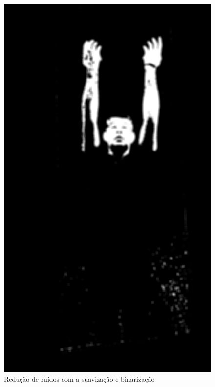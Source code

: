 \begin{figure}[H]
    \centering
    \caption{Redução de ruídos com a suavização e binarização}
        \begin{minipage}{\sizeImg\textwidth}
            \includegraphics[width=\textwidth]{figuras/mao_barra/blur.png}
        \end{minipage}
        \begin{minipage}{\sizeImg\textwidth}

\end{minipage}
\end{figure}
